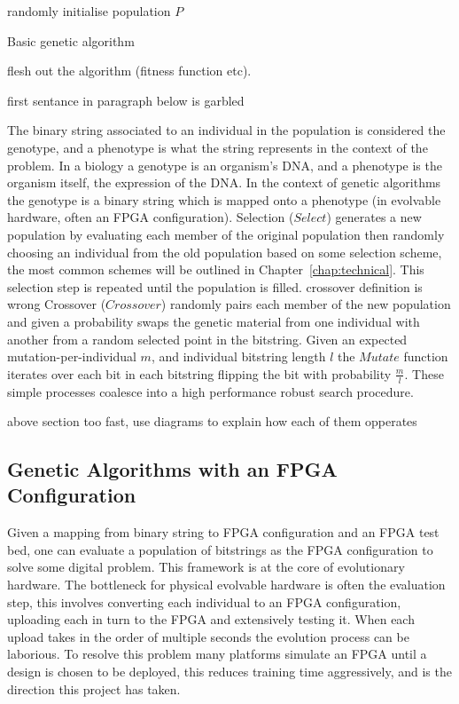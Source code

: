 \begin{algorithm}[t]
	randomly initialise population $P$\;
	\caption{Basic genetic algorithm}
	\label{alg:basic}
\end{algorithm}

\todo flesh out the algorithm (fitness function etc).

\todo first sentance in paragraph below is garbled

The binary string associated to an individual in the
population is considered the genotype, and a phenotype is what the string represents in the
context of the problem. In a biology a genotype is an organism's DNA, and a phenotype is
the organism itself, the expression of the DNA. In the context of genetic algorithms
the genotype is a binary string which is mapped onto a phenotype (in evolvable
hardware, often an FPGA configuration).
Selection ($Select$) generates a new population by evaluating each member of the
original population then
randomly choosing an individual from the old population based on some selection scheme,
the most common schemes will be outlined in Chapter~\ref{chap:technical}.
This selection step is repeated until the population is filled.
\todo crossover definition is wrong
Crossover ($Crossover$) randomly pairs each member of the new population
and given a probability swaps the genetic material from one individual with another from a
random selected point in the bitstring. Given an expected mutation-per-individual $m$, and
individual bitstring length
$l$ the $Mutate$ function iterates over each bit in each bitstring flipping the bit with
probability $\frac{m}{l}$. These simple processes coalesce into a high performance robust search
procedure.

\todo above section too fast, use diagrams to explain how each of them opperates

\subsection{Genetic Algorithms with an FPGA Configuration}
Given a mapping from binary string to FPGA configuration and an FPGA test bed, one can
evaluate a population of bitstrings as the FPGA configuration to solve some digital
problem. This framework is at the core of evolutionary hardware. The bottleneck for physical evolvable
hardware is often the evaluation step, this involves converting each individual
to an FPGA configuration, uploading each in turn
to the FPGA and extensively testing it. When each upload takes in the order of
multiple seconds the evolution process can be laborious. To resolve this problem
many platforms simulate an FPGA until a design is chosen to be deployed, this reduces
training time aggressively, and is the direction this project has taken.

